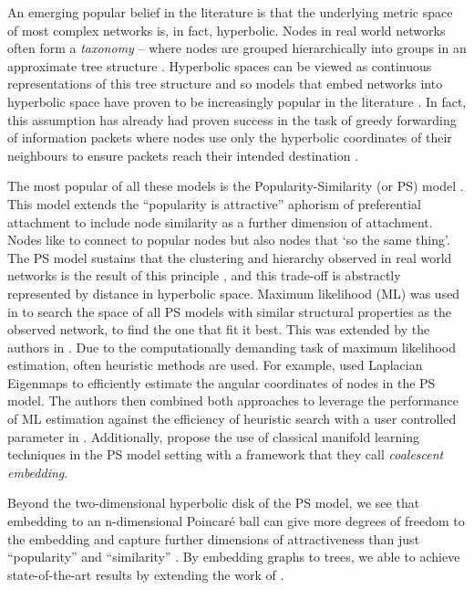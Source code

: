 \documentclass{article}
\begin{document}
An emerging popular belief in the literature is that the underlying metric space of most complex networks is, in fact, hyperbolic. 
Nodes in real world networks often form a \textit{taxonomy} -- where nodes are grouped hierarchically into groups in an approximate tree structure \cite{papadopoulos2011popularity}. 
Hyperbolic spaces can be viewed as continuous representations of this tree structure and so models that embed networks into hyperbolic space have proven to be increasingly popular in the literature \cite{krioukov2009curvature,krioukov2010hyperbolic}. In fact, this assumption has already had proven success in the task of greedy forwarding of information packets where nodes use only the hyperbolic coordinates of their neighbours to ensure packets reach their intended destination \cite{papadopoulos2010greedy}. 

The most popular of all these models is the Popularity-Similarity (or PS) model \cite{papadopoulos2011popularity}. This model extends the ``popularity is attractive'' aphorism of preferential attachment \cite{barabasi1999emergence} to include node similarity as a further dimension of attachment. 
Nodes like to connect to popular nodes but also nodes that `so the same thing'. The PS model sustains that the clustering and hierarchy observed in real world networks is the result of this principle \cite{alanis2016efficient}, and this trade-off is abstractly represented by distance in hyperbolic space. 
Maximum likelihood (ML) was used in \cite{papadopoulos2011popularity} to search the space of all PS models with similar structural properties as the observed network, to find the one that fit it best. This was extended by the authors in \cite{papadopoulos2015networkgeo,papadopoulos2015network}. Due to the computationally demanding task of maximum likelihood estimation, often heuristic methods are used. For example, \cite{alanis2016efficient} used Laplacian Eigenmaps to efficiently estimate the angular coordinates of nodes in the PS model. The authors then combined both approaches to leverage the performance of ML estimation against the efficiency of heuristic search with a user controlled parameter in \cite{alanis2016manifold}. Additionally, \cite{thomas2016machine} propose the use of classical manifold learning techniques in the PS model setting with a framework that they call \textit{coalescent embedding}. 

Beyond the two-dimensional hyperbolic disk of the PS model, we see that embedding to an n-dimensional Poincar\'e ball can give more degrees of freedom to the embedding and capture further dimensions of attractiveness than just ``popularity'' and ``similarity'' \cite{nickel2017poincar,chamberlain2017neural}. By embedding graphs to trees, \cite{de2018representation} we able to achieve state-of-the-art results by extending the work of \cite{sarkar2011low}.
\end{document}

